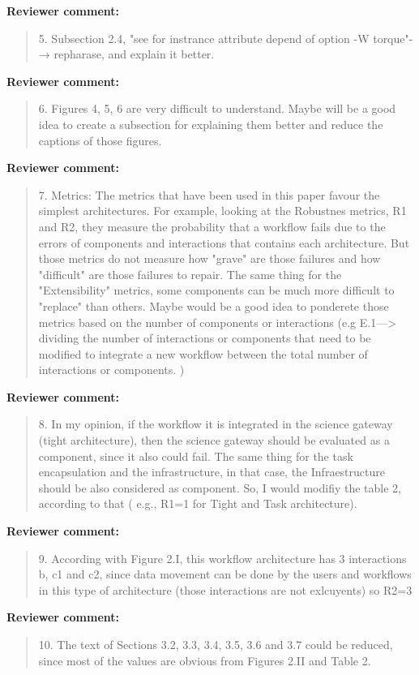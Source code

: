 \documentclass[a4]{letter}
\newenvironment{review}%
{\textbf{Reviewer comment:}\begin{quote}}%
{\end{quote}}%
\begin{document}
\begin{letter}{}
\begin{review}
  5.  Subsection 2.4, "see for instrance attribute depend of option -W
  torque"-→ repharase, and explain it better.
\end{review}

\begin{review}
6.  Figures 4, 5, 6 are very difficult to understand. Maybe will be a
good idea to create a subsection for explaining them better and reduce
the captions of those figures.
\end{review}

\begin{review}
  7.  Metrics: The metrics that have been used in this paper favour
  the simplest architectures. For example, looking at the Robustnes
  metrics, R1 and R2, they measure the probability that a workflow
  fails due to the errors of components and interactions that contains
  each architecture. But those metrics do not measure how "grave" are
  those failures and how "difficult" are those failures to repair. The
  same thing for the "Extensibility" metrics, some components can be
  much more difficult to "replace" than others.  Maybe would be a good
  idea to ponderete those metrics based on the number of components or
  interactions (e.g E.1---> dividing the number of interactions or
  components that need to be modified to integrate a new workflow
  between the total number of interactions or components. )
\end{review}


\begin{review}
8. In my opinion, if the workflow it is integrated in the science
gateway (tight architecture), then the science gateway should be
evaluated as a component, since it also could fail. The same thing for
the task encapsulation and the infrastructure, in that case, the
Infraestructure should be also considered as component. So, I would
modifiy the table 2, according to that ( e.g., R1=1 for Tight and Task
architecture).
\end{review}

\begin{review}
9. According with Figure 2.I, this workflow architecture has 3
interactions b, c1 and c2, since data movement can be done by the
users and workflows in this type of architecture (those interactions
are not exlcuyents) so R2=3
\end{review}

\begin{review}
  10. The text of Sections 3.2, 3.3, 3.4, 3.5, 3.6 and 3.7 could be
  reduced, since most of the values are obvious from Figures 2.II and
  Table 2.
\end{review}


\end{letter}
\end{document}
